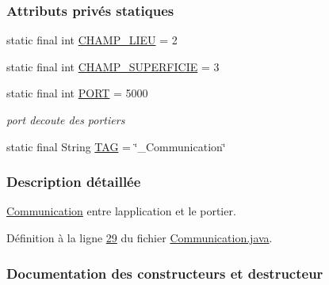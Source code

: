 \subsubsection*{Attributs privés statiques}
\begin{DoxyCompactItemize}
\item 
static final int \hyperlink{classcom_1_1lasalle_1_1meeting_1_1_communication_a6f8e3d2386521c64c50eaa037083be79}{C\+H\+A\+M\+P\+\_\+\+L\+I\+EU} = 2
\item 
static final int \hyperlink{classcom_1_1lasalle_1_1meeting_1_1_communication_a6f16e8be300ba2c9b2d3973f8da79942}{C\+H\+A\+M\+P\+\_\+\+S\+U\+P\+E\+R\+F\+I\+C\+IE} = 3
\item 
static final int \hyperlink{classcom_1_1lasalle_1_1meeting_1_1_communication_abf48fd6a29d87d67f4941494404f1ea7}{P\+O\+RT} = 5000
\begin{DoxyCompactList}\small\item\em port d\textquotesingle{}ecoute des portiers \end{DoxyCompactList}\item 
static final String \hyperlink{classcom_1_1lasalle_1_1meeting_1_1_communication_a5d58f88df1f20b4d61edbed9a82eccab}{T\+AG} = \char`\"{}\+\_\+\+Communication\char`\"{}
\end{DoxyCompactItemize}


\subsubsection{Description détaillée}
\hyperlink{classcom_1_1lasalle_1_1meeting_1_1_communication}{Communication} entre l\textquotesingle{}application et le portier. 

Définition à la ligne \hyperlink{_communication_8java_source_l00029}{29} du fichier \hyperlink{_communication_8java_source}{Communication.\+java}.



\subsubsection{Documentation des constructeurs et destructeur}
\mbox{\label{classcom_1_1lasalle_1_1meeting_1_1_communication_a3d73554b2774d3274ad385b0faa27d14}} 
